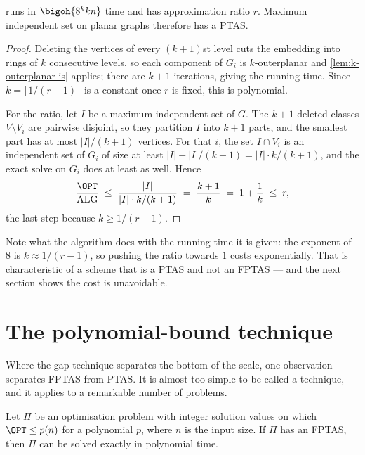 \begin{theorem}\label{thm:planar-is-ptas}
 runs in $\bigoh{8^k k n}$ time and has approximation
ratio $r$. Maximum independent set on planar graphs therefore has a PTAS.
\end{theorem}

\begin{proof}
Deleting the vertices of every $(k+1)$st level cuts the embedding into rings of
$k$ consecutive levels, so each component of $G_i$ is $k$-outerplanar and
\cref{lem:k-outerplanar-is} applies; there are $k+1$ iterations, giving the
running time. Since $k = \lceil 1/(r-1)\rceil$ is a constant once $r$ is fixed,
this is polynomial.

For the ratio, let $I$ be a maximum independent set of $G$. The $k+1$ deleted
classes $V \setminus V_i$ are pairwise disjoint, so they partition $I$ into
$k+1$ parts, and the smallest part has at most $|I|/(k+1)$ vertices. For that
$i$, the set $I \cap V_i$ is an independent set of $G_i$ of size at least
$|I| - |I|/(k+1) = |I| \cdot k/(k+1)$, and the exact solve on $G_i$ does at
least as well. Hence
\[ \frac{\OPT}{\mathrm{ALG}} \;\le\; \frac{|I|}{|I| \cdot k/(k+1)}
   \;=\; \frac{k+1}{k} \;=\; 1 + \frac1k \;\le\; r, \]
the last step because $k \ge 1/(r-1)$.
\end{proof}

Note what the algorithm does with the running time it is given: the exponent of
$8$ is $k \approx 1/(r-1)$, so pushing the ratio towards $1$ costs
exponentially. That is characteristic of a scheme that is a PTAS and not an
FPTAS --- and the next section shows the cost is unavoidable.

\section{The polynomial-bound technique}
\label{sec:polynomial-bound}

Where the gap technique separates the bottom of the scale, one observation
separates FPTAS from PTAS. It is almost too simple to be called a technique,
and it applies to a remarkable number of problems.

\begin{theorem}\label{thm:polynomial-bound}
Let $\Pi$ be an optimisation problem with integer solution values on which
$\OPT \le p(n)$ for a polynomial $p$, where $n$ is the input size. If $\Pi$ has
an FPTAS, then $\Pi$ can be solved exactly in polynomial time.
\end{theorem}

